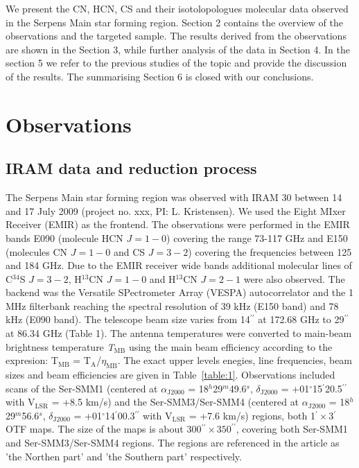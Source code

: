 \documentclass{aa}
\begin{document}
We present the CN, HCN, CS and their isotolopologues molecular data observed in the Serpens Main star forming region. Section 2 contains the overview of the observations and the targeted sample. The results derived from the observations are shown in the Section 3, while further analysis of the data in Section 4. In the section 5 we refer to the previous studies of the topic and provide the discussion of the results. The summarising Section 6 is closed with our conclusions.

\section{Observations}

\subsection{IRAM data and reduction process}
The Serpens Main star forming region was observed with IRAM 30 between 14 and 17 July 2009 (project no. xxx, PI: L. Kristensen). We used the Eight MIxer Receiver (EMIR) as the frontend. The observations were performed in the EMIR bands E090 (molecule HCN $J=1-0$) covering the range 73-117 GHz and E150 (molecules CN $J=1-0$ and CS $J=3-2$) covering the frequencies between 125 and 184 GHz. Due to the EMIR receiver wide bands additional molecular lines of C$^{34}$S $J=3-2$, H$^{13}$CN $J=1-0$ and H$^{13}$CN $J=2-1$ were also observed. The backend was the Versatile SPectrometer Array (VESPA) autocorrelator and the 1 MHz filterbank reaching the spectral resolution of 39 kHz (E150 band) and 78 kHz (E090 band). The telescope beam size varies from 14$^{\prime\prime}$ at 172.68 GHz to 29$^{\prime\prime}$ at 86.34 GHz (Table 1). The antenna temperatures were converted to main-beam brightness temperature \textit{T$_\mathrm{MB}$} using the main beam efficiency according to the expresion: T$_\mathrm{MB}$ = T$_\mathrm{A}$/$\eta_\mathrm{MB}$. The exact upper levels enegies, line frequencies, beam sizes and beam efficiencies are given in Table~\ref{table:1}. Observations included scans of the Ser-SMM1 (centered at $\alpha_\mathrm{J2000}$ = 18$^h$29$^m$49.6$^s$, $\delta_\mathrm{J2000}$ = +01$^{\circ}$15$^{\prime}$20.5$^{\prime\prime}$ with V$_\mathrm{LSR}$ = +8.5 km/s) and the Ser-SMM3/Ser-SMM4 (centered at $\alpha_\mathrm{J2000}$ = 18$^h$29$^m$56.6$^s$, $\delta_\mathrm{J2000}$ = +01$^{\circ}$14$^{\prime}$00.3$^{\prime\prime}$ with V$_\mathrm{LSR}$ = +7.6 km/s) regions, both 1$^{\prime}\times$3$^{\prime}$ OTF maps. The size of the maps is about 300$^{\prime\prime}\times350^{\prime\prime}$, covering both Ser-SMM1 and Ser-SMM3/Ser-SMM4 regions. The regions are referenced in the article as 'the Northen part' and 'the Southern part' respectively. 
\end{document}
